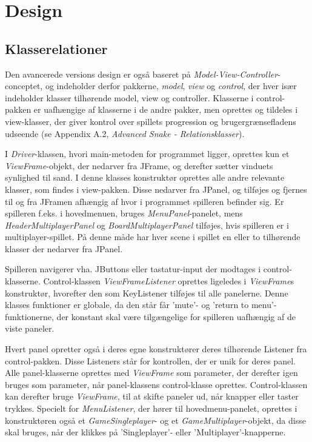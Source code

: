 \section{Design}

\subsection{Klasserelationer}
Den avancerede versions design er også baseret på \textit{Model-View-Controller}-conceptet, og indeholder derfor pakkerne, \textit{model}, \textit{view} og \textit{control}, der hver især indeholder klasser tilhørende model, view og controller. Klasserne i control-pakken er uafhængige af klasserne i de andre pakker, men oprettes og tildeles i view-klasser, der giver kontrol over spillets progression og brugergrænsefladens udseende (se Appendix A.2, \textit{Advanced Snake - Relationsklasser}).
\newline

I \textit{Driver}-klassen, hvori main-metoden for programmet ligger, oprettes kun et \textit{ViewFrame}-objekt, der nedarver fra JFrame, og derefter sætter vinduets synlighed til sand. I denne klasses konstruktør oprettes alle andre relevante klasser, som findes i view-pakken. Disse nedarver fra JPanel, og tilføjes og fjernes til og fra JFramen afhængig af hvor i programmet spilleren befinder sig. Er spilleren f.eks. i hovedmenuen, bruges \textit{MenuPanel}-panelet, mens \textit{HeaderMultiplayerPanel} og \textit{BoardMultiplayerPanel} tilføjes, hvis spilleren er i multiplayer-spillet. På denne måde har hver scene i spillet en eller to tilhørende klasser der nedarver fra JPanel.
\newline

Spilleren navigerer vha. JButtons eller tastatur-input der modtages i control-klasserne. Control-klassen \textit{ViewFrameListener} oprettes ligeledes i \textit{ViewFrame}s konstruktør, hvorefter den som KeyListener tilføjes til alle panelerne. Denne klasses funktioner er globale, da den står får 'mute'- og 'return to menu'-funktionerne, der konstant skal være tilgængelige for spilleren uafhængig af de viste paneler.
\newline

Hvert panel opretter også i deres egne konstruktører deres tilhørende Listener fra control-pakken. Disse Listeners står for kontrollen, der er unik for deres panel. Alle panel-klasserne oprettes med \textit{ViewFrame} som parameter, der derefter igen bruges som parameter, når panel-klassens control-klasse oprettes. Control-klassen kan derefter bruge \textit{ViewFrame}, til at skifte paneler ud, når knapper eller taster trykkes. Specielt for \textit{MenuListener}, der hører til hovedmenu-panelet, oprettes i konstruktøren også et \textit{GameSingleplayer}- og et \textit{GameMultiplayer}-objekt, da disse skal bruges, når der klikkes på 'Singleplayer'- eller 'Multiplayer'-knapperne. 
\newline

